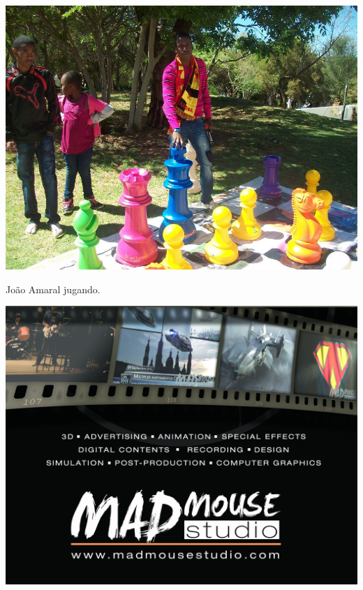 \begin{center}
\begin{figurebox}
\begin{center}
  \includegraphics[scale=0.2]{jugando1.jpg}\end{center}
\centering João Amaral jugando.
 \end{figurebox}
\end{center}

\noindent
\centering\includegraphics[scale=0.5]{pubmm.png}


\newpage




